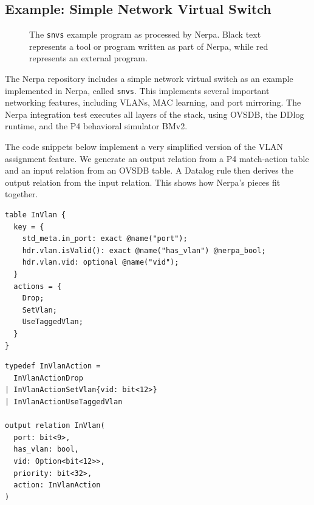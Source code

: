 \documentclass[sigconf, nonacm]{acmart}
\begin{document}
\subsection{Example: Simple Network Virtual Switch}

\begin{figure}
    \centering
    \caption{The \texttt{snvs} example program as processed by Nerpa. Black text represents a tool or program written as part of Nerpa, while red represents an external program.}
    \label{fig:snvs-diagram}
\end{figure}

The Nerpa repository includes a simple network virtual switch as an example implemented in Nerpa, called \texttt{snvs}.
This implements several important networking features, including VLANs, MAC learning, and port mirroring.
The Nerpa integration test executes all layers of the stack, using OVSDB, the DDlog runtime, and the P4 behavioral
simulator BMv2.

The code snippets below implement a very simplified version of the VLAN assignment feature. We generate an output relation from a P4 match-action table and an input relation from an OVSDB table. A Datalog rule then derives the output relation from the input relation. This shows how Nerpa's pieces fit together.

\lstset{
basicstyle=\tiny,
frame=single,
tabsize=2,
breaklines=true
}
\noindent\begin{minipage}{.48\columnwidth}
\begin{lstlisting}[title=P4 match-action table,frame=tlrb,language=p4]
table InVlan {
  key = {
    std_meta.in_port: exact @name("port");
    hdr.vlan.isValid(): exact @name("has_vlan") @nerpa_bool;
    hdr.vlan.vid: optional @name("vid");
  }
  actions = {
    Drop;
    SetVlan;
    UseTaggedVlan;
  }
}
\end{lstlisting}
\end{minipage}\hfill
\begin{minipage}{.48\columnwidth}
\begin{lstlisting}[title=DDlog output relation generated from the P4 program,frame=tlrb,language=ddlog]
typedef InVlanAction =
  InVlanActionDrop
| InVlanActionSetVlan{vid: bit<12>}
| InVlanActionUseTaggedVlan

output relation InVlan(
  port: bit<9>,
  has_vlan: bool,
  vid: Option<bit<12>>,
  priority: bit<32>,
  action: InVlanAction
)
\end{lstlisting}
\end{minipage}
\end{document}
